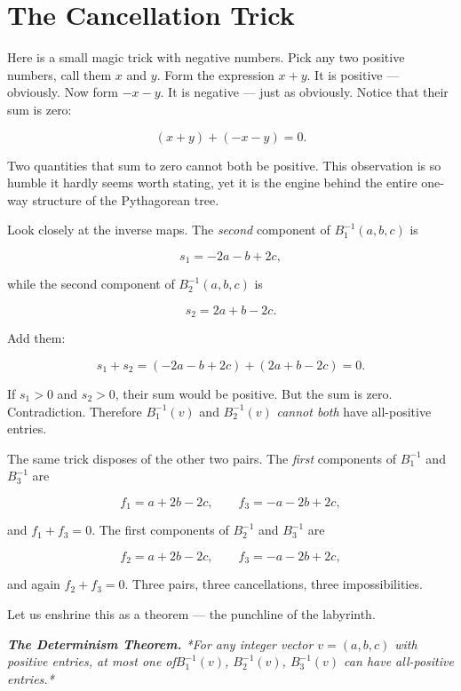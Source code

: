 \documentclass[11pt,openright,twoside]{book}
\renewenvironment{quotation}{%
  \par\vspace{8pt}%
  \begin{list}{}{%
    \setlength{\leftmargin}{2em}%
    \setlength{\rightmargin}{2em}%
  }\item[]\itshape\color{pullquote}%
}{%
  \end{list}%
  \par\vspace{8pt}%
}
\theoremstyle{definition}
\begin{document}
\bigskip


\section{The Cancellation Trick}

Here is a small magic trick with negative numbers. Pick any two positive numbers, call them $x$ and $y$. Form the expression $x + y$. It is positive --- obviously. Now form $-x - y$. It is negative --- just as obviously. Notice that their sum is zero:

\[(x + y) + (-x - y) = 0.\]

Two quantities that sum to zero cannot both be positive. This observation is so humble it hardly seems worth stating, yet it is the engine behind the entire one-way structure of the Pythagorean tree.

Look closely at the inverse maps. The \textit{second} component of $B_1^{-1}(a, b, c)$ is

\[s_1 = -2a - b + 2c,\]

while the second component of $B_2^{-1}(a, b, c)$ is

\[s_2 = 2a + b - 2c.\]

Add them:

\[s_1 + s_2 = (-2a - b + 2c) + (2a + b - 2c) = 0.\]

If $s_1 > 0$ and $s_2 > 0$, their sum would be positive. But the sum is zero. Contradiction. Therefore $B_1^{-1}(v)$ and $B_2^{-1}(v)$ \textit{cannot both} have all-positive entries.

The same trick disposes of the other two pairs. The \textit{first} components of $B_1^{-1}$ and $B_3^{-1}$ are

\[f_1 = a + 2b - 2c, \qquad f_3 = -a - 2b + 2c,\]

and $f_1 + f_3 = 0$. The first components of $B_2^{-1}$ and $B_3^{-1}$ are

\[f_2 = a + 2b - 2c, \qquad f_3 = -a - 2b + 2c,\]

and again $f_2 + f_3 = 0$. Three pairs, three cancellations, three impossibilities.

Let us enshrine this as a theorem --- the punchline of the labyrinth.

\begin{quotation}
\noindent\itshape \textbf{The Determinism Theorem.} *For any integer vector $v = (a, b, c)$ with positive entries, at most one of$B_1^{-1}(v)$, $B_2^{-1}(v)$, $B_3^{-1}(v)$ can have all-positive entries.*
\end{quotation}
\end{document}

